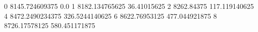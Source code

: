 0 8145.724609375 0.0
1 8182.134765625 36.41015625
2 8262.84375 117.119140625
4 8472.2490234375 326.5244140625
6 8622.76953125 477.044921875
8 8726.17578125 580.451171875
